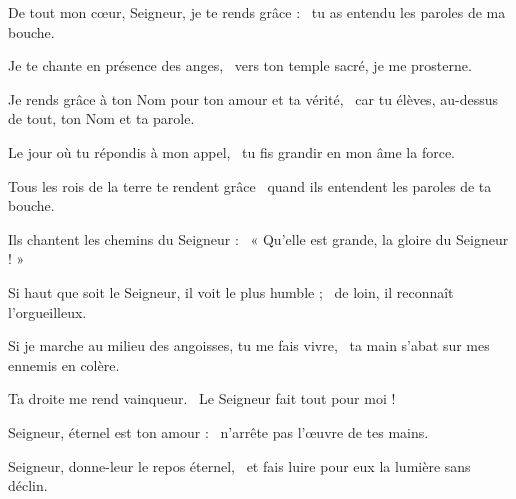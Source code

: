 \item De tout mon cœur, Seigneur, je te rends grâce :~\psstar{} tu as entendu les paroles de ma bouche.

\item Je te chante en présence des anges,~\psstar{} vers ton temple sacré, je me prosterne.

\item Je rends grâce à ton Nom pour ton amour et ta vérité,~\psstar{} car tu élèves, au-dessus de tout, ton Nom et ta parole.

\item Le jour où tu répondis à mon appel,~\psstar{} tu fis grandir en mon âme la force.

\item Tous les rois de la terre te rendent grâce~\psstar{} quand ils entendent les paroles de ta bouche.

\item Ils chantent les chemins du Seigneur :~\psstar{} « Qu'elle est grande, la gloire du Seigneur ! »

\item Si haut que soit le Seigneur, il voit le plus humble ;~\psstar{} de loin, il reconnaît l'orgueilleux.

\item Si je marche au milieu des angoisses, tu me fais vivre,~\psstar{} ta main s'abat sur mes ennemis en colère.

\item Ta droite me rend vainqueur.~\psstar{} Le Seigneur fait tout pour moi !

\item Seigneur, éternel est ton amour :~\psstar{} n'arrête pas l'œuvre de tes mains.

\item Seigneur, donne-leur le repos éternel,~\psstar{} et fais luire pour eux la lumière sans déclin.